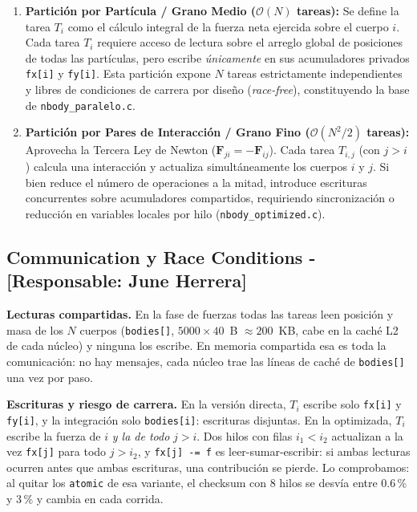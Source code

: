 \documentclass[11pt,a4paper]{article}
\begin{document}
\begin{enumerate}
    \item \textbf{Partición por Partícula / Grano Medio ($\mathcal{O}(N)$ tareas):}
    Se define la tarea $T_i$ como el cálculo integral de la fuerza neta ejercida sobre el cuerpo $i$. Cada tarea $T_i$ requiere acceso de lectura sobre el arreglo global de posiciones de todas las partículas, pero escribe \textit{únicamente} en sus acumuladores privados \texttt{fx[i]} y \texttt{fy[i]}. Esta partición expone $N$ tareas estrictamente independientes y libres de condiciones de carrera por diseño (\textit{race-free}), constituyendo la base de \texttt{nbody\_paralelo.c}.
    
    \item \textbf{Partición por Pares de Interacción / Grano Fino ($\mathcal{O}(N^2 / 2)$ tareas):}
    Aprovecha la Tercera Ley de Newton ($\mathbf{F}_{ji} = -\mathbf{F}_{ij}$). Cada tarea $T_{i,j}$ (con $j > i$) calcula una interacción y actualiza simultáneamente los cuerpos $i$ y $j$. Si bien reduce el número de operaciones a la mitad, introduce escrituras concurrentes sobre acumuladores compartidos, requiriendo sincronización o reducción en variables locales por hilo (\texttt{nbody\_optimized.c}).
\end{enumerate}

\subsection{Communication y Race Conditions - [Responsable: June Herrera]}
\textbf{Lecturas compartidas.} En la fase de fuerzas todas las tareas leen posición y masa de los $N$ cuerpos (\texttt{bodies[]}, $5000 \times 40$~B $\approx 200$~KB, cabe en la caché L2 de cada núcleo) y ninguna los escribe. En memoria compartida esa es toda la comunicación: no hay mensajes, cada núcleo trae las líneas de caché de \texttt{bodies[]} una vez por paso.

\textbf{Escrituras y riesgo de carrera.} En la versión directa, $T_i$ escribe solo \texttt{fx[i]} y \texttt{fy[i]}, y la integración solo \texttt{bodies[i]}: escrituras disjuntas. En la optimizada, $T_i$ escribe la fuerza de $i$ \emph{y la de todo} $j > i$. Dos hilos con filas $i_1 < i_2$ actualizan a la vez \texttt{fx[j]} para todo $j > i_2$, y \texttt{fx[j] -= f} es leer-sumar-escribir: si ambas lecturas ocurren antes que ambas escrituras, una contribución se pierde. Lo comprobamos: al quitar los \texttt{atomic} de esa variante, el checksum con 8 hilos se desvía entre 0.6\,\% y 3\,\% y cambia en cada corrida.
\end{document}
